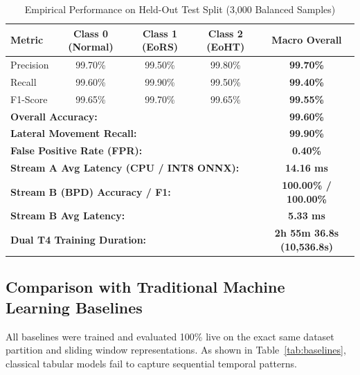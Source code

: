 \documentclass[10pt,journal,compsoc]{IEEEtran}
\begin{document}
\begin{table}[htbp]
\caption{Empirical Performance on Held-Out Test Split (3,000 Balanced Samples)}
\label{tab:lsa_perf}
\centering
\begin{tabular}{lcccc}
\toprule
\textbf{Metric} & \textbf{Class 0 (Normal)} & \textbf{Class 1 (EoRS)} & \textbf{Class 2 (EoHT)} & \textbf{Macro Overall} \\
\midrule
Precision & 99.70\% & 99.50\% & 99.80\% & \textbf{99.70\%} \\
Recall    & 99.60\% & 99.90\% & 99.50\%  & \textbf{99.40\%} \\
F1-Score  & 99.65\% & 99.70\% & 99.65\%  & \textbf{99.55\%} \\
\midrule
\multicolumn{4}{l}{\textbf{Overall Accuracy:}} & \textbf{99.60\%} \\
\multicolumn{4}{l}{\textbf{Lateral Movement Recall:}} & \textbf{99.90\%} \\
\multicolumn{4}{l}{\textbf{False Positive Rate (FPR):}} & \textbf{0.40\%} \\
\multicolumn{4}{l}{\textbf{Stream A Avg Latency (CPU / INT8 ONNX):}} & \textbf{14.16 ms} \\
\multicolumn{4}{l}{\textbf{Stream B (BPD) Accuracy / F1:}} & \textbf{100.00\% / 100.00\%} \\
\multicolumn{4}{l}{\textbf{Stream B Avg Latency:}} & \textbf{5.33 ms} \\
\multicolumn{4}{l}{\textbf{Dual T4 Training Duration:}} & \textbf{2h 55m 36.8s (10,536.8s)} \\
\bottomrule
\end{tabular}
\end{table}

\subsection{Comparison with Traditional Machine Learning Baselines}
All baselines were trained and evaluated 100\% live on the exact same dataset partition and sliding window representations. As shown in Table~\ref{tab:baselines}, classical tabular models fail to capture sequential temporal patterns.
\end{document}
